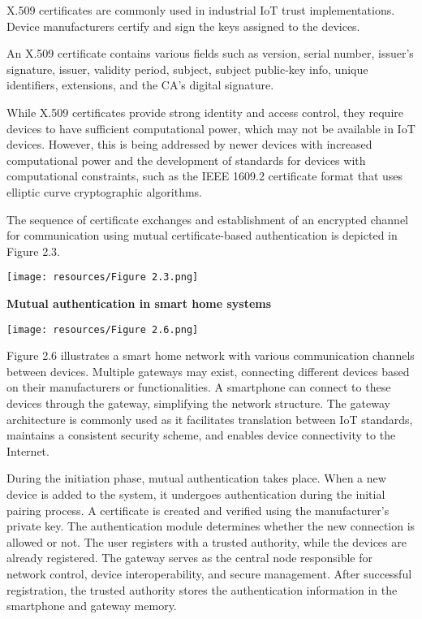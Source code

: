 X.509 certificates are commonly used in industrial IoT trust implementations. Device manufacturers certify and sign the keys assigned to the devices.

An X.509 certificate contains various fields such as version, serial number, issuer's signature, issuer, validity period, subject, subject public-key info, unique identifiers, extensions, and the CA's digital signature.

While X.509 certificates provide strong identity and access control, they require devices to have sufficient computational power, which may not be available in IoT devices. However, this is being addressed by newer devices with increased computational power and the development of standards for devices with computational constraints, such as the IEEE 1609.2 certificate format that uses elliptic curve cryptographic algorithms.

The sequence of certificate exchanges and establishment of an encrypted channel for communication using mutual certificate-based authentication is depicted in Figure 2.3.

\texttt{[image: resources/Figure 2.3.png]}

 \newpage
\textbf{Mutual authentication in smart home systems}

\texttt{[image: resources/Figure 2.6.png]}

Figure 2.6 illustrates a smart home network with various communication channels between devices. Multiple gateways may exist, connecting different devices based on their manufacturers or functionalities. A smartphone can connect to these devices through the gateway, simplifying the network structure. The gateway architecture is commonly used as it facilitates translation between IoT standards, maintains a consistent security scheme, and enables device connectivity to the Internet.

During the initiation phase, mutual authentication takes place. When a new device is added to the system, it undergoes authentication during the initial pairing process. A certificate is created and verified using the manufacturer's private key. The authentication module determines whether the new connection is allowed or not. The user registers with a trusted authority, while the devices are already registered. The gateway serves as the central node responsible for network control, device interoperability, and secure management. After successful registration, the trusted authority stores the authentication information in the smartphone and gateway memory.

